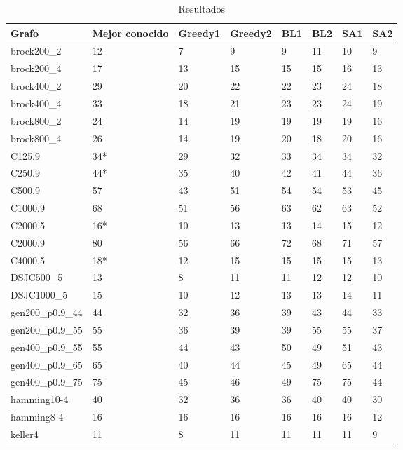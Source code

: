 \begin{table}[H]
\centering
\caption{Resultados}
\begin{tabular}{|l|l|l|l|l|l|l|l|}
\hline
Grafo              & Mejor conocido & Greedy1 & Greedy2 & BL1 & BL2 & SA1 & SA2 \\ \hline
brock200\_2        & 12 & 7 & 9 & 9 & 11 & 10 & 9 \\ \hline
brock200\_4        & 17 & 13 & 15 & 15 & 15 & 16 & 13 \\ \hline
brock400\_2        & 29 & 20 & 22 & 22 & 23 & 24 & 18 \\ \hline
brock400\_4        & 33 & 18 & 21 & 23 & 23 & 24 & 19 \\ \hline
brock800\_2        & 24 & 14 & 19 & 19 & 19 & 19 & 16 \\ \hline
brock800\_4        & 26 & 14 & 19 & 20 & 18 & 20 & 16 \\ \hline
C125.9             & 34* & 29 & 32 & 33 & 34 & 34 & 32 \\ \hline
C250.9             & 44* & 35 & 40 & 42 & 41 & 44 & 36 \\ \hline
C500.9             & 57 & 43 & 51 & 54 & 54 & 53 & 45 \\ \hline
C1000.9            & 68 & 51 & 56 & 63 & 62 & 63 & 52 \\ \hline
C2000.5            & 16* & 10 & 13 & 13 & 14 & 15 & 12 \\ \hline
C2000.9            & 80 & 56 & 66 & 72 & 68 & 71 & 57 \\ \hline
C4000.5            & 18* & 12 & 15 & 15 & 15 & 15 & 13 \\ \hline
DSJC500\_5         & 13 & 8 & 11 & 11 & 12 & 12 & 10 \\ \hline
DSJC1000\_5        & 15 & 10 & 12 & 13 & 13 & 14 & 11 \\ \hline
gen200\_p0.9\_44   & 44 & 32 & 36 & 39 & 43 & 44 & 33 \\ \hline
gen200\_p0.9\_55   & 55 & 36 & 39 & 39 & 55 & 55 & 37 \\ \hline
gen400\_p0.9\_55   & 55 & 44 & 43 & 50 & 49 & 51 & 43 \\ \hline
gen400\_p0.9\_65   & 65 & 40 & 44 & 45 & 49 & 65 & 44 \\ \hline
gen400\_p0.9\_75   & 75 & 45 & 46 & 49 & 75 & 75 & 44 \\ \hline
hamming10-4        & 40 & 32 & 36 & 36 & 40 & 40 & 30 \\ \hline
hamming8-4         & 16 & 16 & 16 & 16 & 16 & 16 & 12 \\ \hline
keller4            & 11 & 8 & 11 & 11 & 11 & 11 & 9 \\ \hline

\end{tabular}
\end{table}
